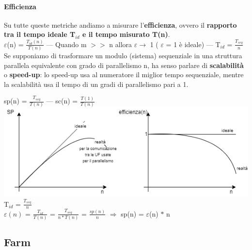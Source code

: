 \documentclass[10pt]{report}
\begin{document}
\paragraph{Efficienza} Su tutte queste metriche andiamo a misurare l'\textbf{efficienza}, ovvero il \textbf{rapporto tra il tempo ideale T$_{id}$ e il tempo misurato T(n)}.\\
$\varepsilon$(n) = $\frac{T_{id}(n)}{T(n)}$ --- Quando m $>>$ n allora $\varepsilon \rightarrow$ 1 ( $\varepsilon$ = 1 è ideale) --- T$_{id}$ = $\frac{T_{seq}}{n}$
\pagebreak
Se supponiamo di trasformare un modulo (sistema) sequenziale in una struttura parallela equivalente con grado di parallelismo n, ha senso parlare di \textbf{scalabilità} o \textbf{speed-up}: lo speed-up usa al numeratore il miglior tempo sequenziale, mentre la scalabilità usa il tempo di un gradi di parallelismo pari a 1.
\begin{center}
sp(n) = $\frac{T_{seq}}{T(n)}$ --- sc(n) = $\frac{T(1)}{T(n)}$\\
\includegraphics[scale=0.8]{spscefficienzaplots.png}\\
T$_{id}$ = $\frac{T_{seq}}{n}$\\$\varepsilon(n)$ = $\frac{T_{id}}{T(n)}$ = $\frac{T_{seq}}{n * T(n)}$ = $\frac{sp(n)}{n}$ $\Rightarrow$ sp(n) = $\varepsilon$(n) $*$ n
\end{center}
\subsection{Farm}
\end{document}

